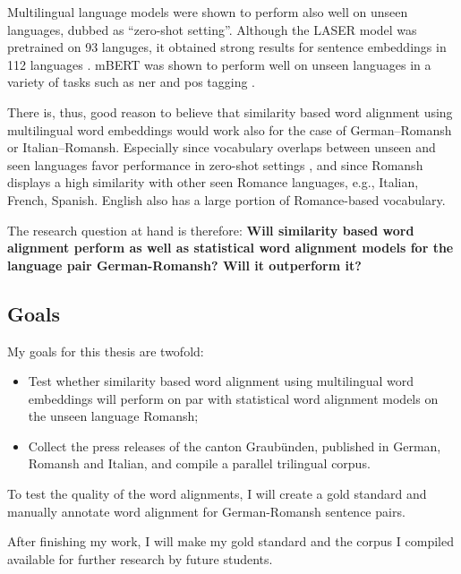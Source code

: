 Multilingual language models were shown to perform also well on unseen languages, dubbed as \enquote{zero-shot setting}. 
Although the LASER model was pretrained on 93 languges, it obtained strong results for sentence embeddings in 112 languages \autocite{artexte-schwenk-2019-laser}. 
mBERT was shown to perform well on unseen languages in a variety of tasks such as \acrfull{ner} and \acrfull{pos} tagging \autocite{pires-etal-2019-multilingual}.

There is, thus, good reason to believe that similarity based word alignment using multilingual word embeddings would work also for the case of German--Romansh or Italian--Romansh. 
Especially since vocabulary overlaps between unseen and seen languages favor performance in zero-shot settings \autocite{pires-etal-2019-multilingual}, and since Romansh displays a high similarity with other seen Romance languages, e.g., Italian, French, Spanish. 
English also has a large portion of Romance-based vocabulary.

The research question at hand is therefore: \textbf{Will similarity based word alignment perform as well as statistical word alignment models for the language pair German-Romansh? 
Will it outperform it?}



\subsection{Goals}
My goals for this thesis are twofold:
\begin{itemize}
	\item Test whether similarity based word alignment using multilingual word embeddings will perform on par with statistical word alignment models on the unseen language Romansh;

	\item Collect the press releases of the canton Graubünden, published in German, Romansh and Italian, and compile a parallel trilingual corpus. 

\end{itemize}
To test the quality of the word alignments, I will create a gold standard and manually annotate word alignment for German-Romansh sentence pairs.

After finishing my work, I will make my gold standard and the corpus I compiled available for further research by future students.

